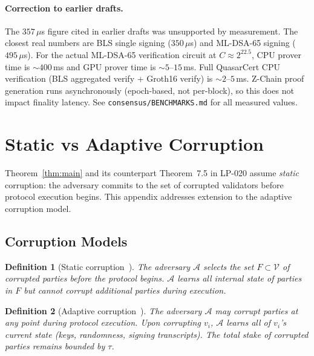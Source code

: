 \documentclass[11pt]{article}
\newtheorem{definition}{Definition}
\begin{document}
\paragraph{Correction to earlier drafts.}
The $357\,\mu$s figure cited in earlier drafts was unsupported by
measurement.  The closest real numbers are BLS single signing
($350\,\mu$s) and ML-DSA-65 signing ($495\,\mu$s).  For the actual
ML-DSA-65 verification circuit at $C \approx 2^{22.5}$, CPU prover time
is $\sim 400$\,ms and GPU prover time is $\sim 5\text{--}15$\,ms.  Full
QuasarCert CPU verification (BLS aggregated verify + Groth16 verify) is
$\sim 2\text{--}5$\,ms.  Z-Chain proof generation runs asynchronously
(epoch-based, not per-block), so this does not impact finality
latency.  See \texttt{consensus/BENCHMARKS.md} for all measured values.

\section{Static vs Adaptive Corruption}
\label{app:adaptive}

Theorem~\ref{thm:main} and its counterpart Theorem~7.5 in LP-020
assume \emph{static} corruption: the adversary commits to the set of
corrupted validators before protocol execution begins.  This appendix
addresses extension to the adaptive corruption model.

\subsection{Corruption Models}

\begin{definition}[Static corruption~\cite{canetti2001}]
The adversary $\mathcal{A}$ selects the set $F \subset \mathcal{V}$
of corrupted parties before the protocol begins.  $\mathcal{A}$ learns
all internal state of parties in $F$ but cannot corrupt additional
parties during execution.
\end{definition}

\begin{definition}[Adaptive corruption~\cite{canetti2001}]
The adversary $\mathcal{A}$ may corrupt parties at any point during
protocol execution.  Upon corrupting $v_i$, $\mathcal{A}$ learns all
of $v_i$'s current state (keys, randomness, signing transcripts).
The total stake of corrupted parties remains bounded by $\tau$.
\end{definition}
\end{document}

